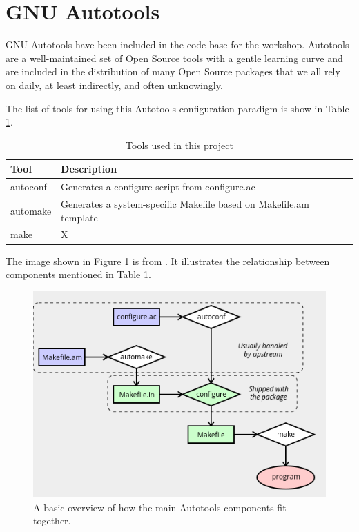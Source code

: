 \section{\label{sec:autotools}GNU Autotools}

\justifying
GNU Autotools have been included in the code base for the workshop. Autotools are a well-maintained set of Open Source tools with a gentle learning curve and are included in the distribution of many Open Source packages that we all rely on daily, at least indirectly, and often unknowingly.

\justifying
The list of tools for using this Autotools configuration paradigm is show in Table \ref{Autotools}.
\vspace{2mm}

\begin{table}[ht]
	\centering
	\begin{tabular}{|l|l|}\hline
		Tool & Description \\\hline
		autoconf & Generates a configure script from configure.ac   \\\hline
		automake & Generates a system-specific Makefile based on Makefile.am template    \\\hline
		make  &   X    \\\hline
	\end{tabular}
	\caption{Tools used in this project}
	\label{Autotools}
\end{table}
\vspace{2mm}

\justifying
The image shown in Figure \ref{diagram} is from \cite{autobasics}.
It illustrates the relationship between components mentioned in Table \ref{Autotools}.
\vspace{2mm}

\begin{figure}[ht]
	\includegraphics[width=12cm]{images/diagram.png}
	\caption{A basic overview of how the main Autotools components fit together.}
	\label{diagram}
\end{figure}
\vspace{2mm}

